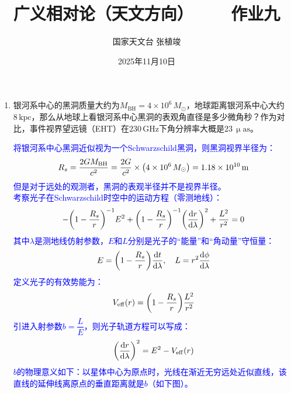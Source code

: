\documentclass[a4paper]{article}
\title{\textbf{广义相对论（天文方向）\ \ \ \ 作业九}}
\author{国家天文台 张植竣}
\date{2025年11月10日}
\begin{document}
\maketitle

\begin{enumerate}
    \item 银河系中心的黑洞质量大约为$M_{\mathrm{BH}} = 4 \times 10^6\,M_\odot$，地球距离银河系中心大约$8\,\mathrm{kpc}$，那么从地球上看银河系中心黑洞的表观角直径是多少微角秒？作为对比，事件视界望远镜（EHT）在$230\,\mathrm{GHz}$下角分辨率大概是$23\,\upmu\mathrm{as}$。

    \textcolor{blue}{
    将银河系中心黑洞近似视为一个Schwarzschild黑洞，则黑洞视界半径为：
    \[
        R_s = \frac{2GM_{\mathrm{BH}}}{c^2} = \frac{2G}{c^2} \times \qty(4 \times 10^6\,M_\odot) = 1.18 \times 10^{10}\,\mathrm{m}
    \]
    但是对于远处的观测者，黑洞的表观半径并不是视界半径。 \\
    考察光子在Schwarzschild时空中的运动方程（零测地线）：
    \[
        -\qty(1 - \frac{R_s}{r})^{-1} E^2 + \qty(1 - \frac{R_s}{r})^{-1} \qty(\dv{r}{\lambda})^2 + \frac{L^2}{r^2} = 0
    \]
    其中$\lambda$是测地线仿射参数，$E$和$L$分别是光子的“能量”和“角动量”守恒量：
    \[
        E = \qty(1 - \frac{R_s}{r}) \dv{t}{\lambda}, \quad L = r^2 \dv{\phi}{\lambda}
    \]
    定义光子的有效势能为：
    \[
        V_{\mathrm{eff}}(r) = \qty(1 - \frac{R_s}{r}) \frac{L^2}{r^2}
    \]
    引进入射参数$b = \dfrac{L}{E}$，则光子轨道方程可以写成：
    \[
        \qty(\dv{r}{\lambda})^2 = E^2 - V_{\mathrm{eff}}(r)
    \]
    $b$的物理意义如下：以星体中心为原点时，光线在渐近无穷远处近似直线，该直线的延伸线离原点的垂直距离就是$b$（如下图）。
    \begin{figure}
    \centering

\end{figure}}
\end{enumerate}
\end{document}
